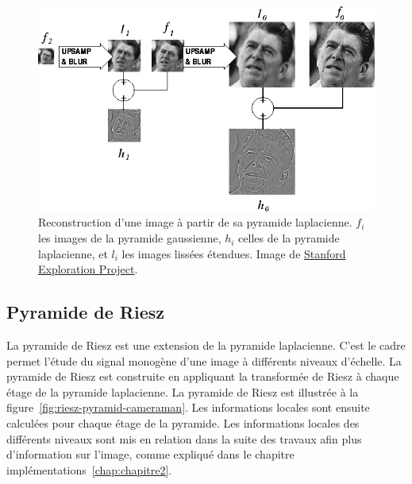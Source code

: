 \begin{figure}
    \centering
    \includegraphics[width=.85\textwidth]{contenu/resources/images/laplacian_pyramid_reconstruction}
    \caption[Reconstruction d'une image à partir de sa pyramide laplacienne]{Reconstruction d'une image à partir de sa pyramide laplacienne. $f_i$ les images de la pyramide gaussienne, $h_i$ celles de la pyramide laplacienne, et $l_i$ les images lissées étendues. Image de \href{https://web.archive.org/web/20230203082428/http://sepwww.stanford.edu/data/media/public/sep/morgan/texturematch/paper_html/node3.html}{Stanford Exploration Project}.}
    \label{fig:laplace-reconstruction}
\end{figure}

\subsection{Pyramide de Riesz}

La \og pyramide de Riesz \fg est une extension de la pyramide laplacienne. C'est le cadre permet l'étude du signal monogène d'une image à différents niveaux d'échelle. La pyramide de Riesz est construite en appliquant la transformée de Riesz à chaque étage de la pyramide laplacienne. La pyramide de Riesz est illustrée à la figure~\ref{fig:riesz-pyramid-cameraman}. Les informations locales sont ensuite calculées pour chaque étage de la pyramide. Les informations locales des différents niveaux sont mis en relation dans la suite des travaux afin plus d'information sur l'image, comme expliqué dans le chapitre implémentations~\ref{chap:chapitre2}.

\bigskip

